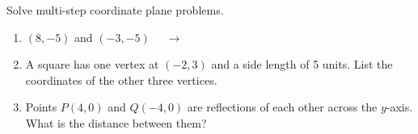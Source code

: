 \documentclass[12pt, letterpaper, fleqn]{article}
\newcommand{\blank}{\underline{\hspace{2.2cm}}}
\begin{document}
\noindent
Solve multi-step coordinate plane problems.

\vspace{3mm}
\begin{enumerate}[itemsep=2.4cm, leftmargin=0.6cm]
\item $(8, -5)$ and $(-3, -5)$ $\quad\rightarrow\quad$ \blank

\vspace{2.3cm}

\item A square has one vertex at $(-2, 3)$ and a side length of 5 units. List the coordinates of the other three vertices.

\vspace{2.3cm}

\item Points $P(4, 0)$ and $Q(-4, 0)$ are reflections of each other across the $y$-axis. What is the distance between them?

\vspace{2.5cm}

\end{enumerate}
\end{document}
